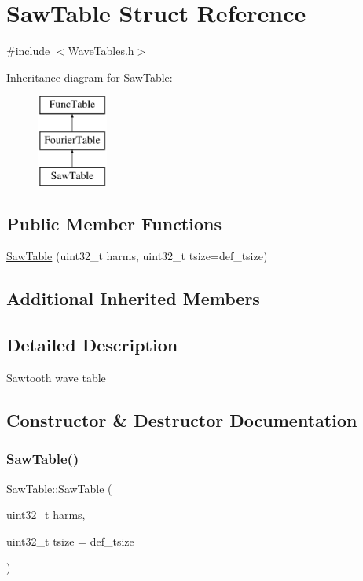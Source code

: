 \hypertarget{struct_saw_table}{}\section{Saw\+Table Struct Reference}
\label{struct_saw_table}


{\ttfamily \#include $<$Wave\+Tables.\+h$>$}

Inheritance diagram for Saw\+Table\+:\begin{figure}[H]
\begin{center}
\leavevmode
\includegraphics[height=3.000000cm]{struct_saw_table}
\end{center}
\end{figure}
\subsection*{Public Member Functions}
\begin{DoxyCompactItemize}
\item 
\hyperlink{struct_saw_table_a516fb9a4d13a31694fc820b2f326b6aa}{Saw\+Table} (uint32\+\_\+t harms, uint32\+\_\+t tsize=def\+\_\+tsize)
\end{DoxyCompactItemize}
\subsection*{Additional Inherited Members}


\subsection{Detailed Description}
Sawtooth wave table 

\subsection{Constructor \& Destructor Documentation}
\mbox{\label{struct_saw_table_a516fb9a4d13a31694fc820b2f326b6aa}} 
\subsubsection{\texorpdfstring{Saw\+Table()}{SawTable()}}
{\footnotesize\ttfamily Saw\+Table\+::\+Saw\+Table (\begin{DoxyParamCaption}\item[{uint32\+\_\+t}]{harms,  }\item[{uint32\+\_\+t}]{tsize = {\ttfamily def\+\_\+tsize} }\end{DoxyParamCaption})\hspace{0.3cm}{\ttfamily [inline]}}

